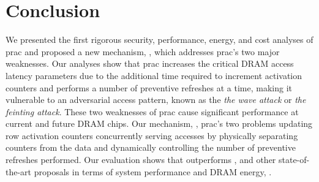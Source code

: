 \section{Conclusion}
\label{sec:conclusion}

We presented the first rigorous security, performance, energy, and cost analyses of \gls{prac} and proposed a new mechanism, \X{}, which addresses \gls{prac}'s two major weaknesses.
Our analyses show that \gls{prac} increases the critical DRAM access latency parameters due to the additional time required to increment activation counters and performs a  number of preventive refreshes at a time, making it vulnerable to an adversarial access pattern, known as the \emph{the wave attack} or \emph{the feinting attack}.
These two weaknesses of \gls{prac} cause significant performance  at current and future DRAM chips.
Our mechanism, \X{},  \gls{prac}'s two  problems   updating row activation counters concurrently  serving accesses by physically separating counters from the data and
 dynamically controlling the number of preventive refreshes performed.
Our evaluation shows that \X{} outperforms , and  other state-of-the-art  proposals in terms of  system performance and DRAM energy, .


